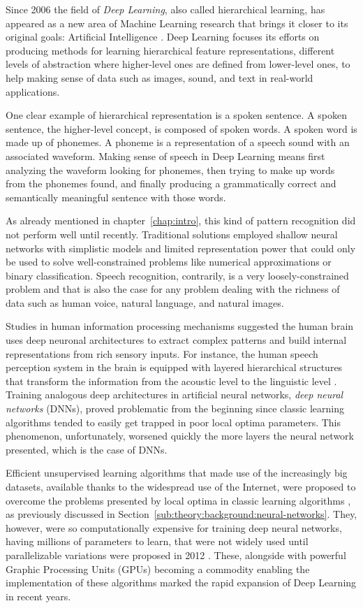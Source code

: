 Since 2006 the field of \emph{Deep Learning}, also called hierarchical learning, has appeared as a new area of Machine Learning research that brings it closer to its original goals: Artificial Intelligence \cite{Deng2014}.
Deep Learning focuses its efforts on producing methods for learning hierarchical feature representations, different levels of abstraction where higher-level ones are defined from lower-level ones, to help making sense of data such as images, sound, and text in real-world applications.

One clear example of hierarchical representation is a spoken sentence.
A spoken sentence, the higher-level concept, is composed of spoken words.
A spoken word is made up of phonemes.
A phoneme is a representation of a speech sound with an associated waveform.
Making sense of speech in Deep Learning means first analyzing the waveform looking for phonemes, then trying to make up words from the phonemes found, and finally producing a grammatically correct and semantically meaningful sentence with those words.

As already mentioned in chapter~\ref{chap:intro}, this kind of pattern recognition did not perform well until recently.
Traditional solutions employed shallow neural networks with simplistic models and limited representation power that could only be used to solve well-constrained problems like numerical approximations or binary classification.
Speech recognition, contrarily, is a very loosely-constrained problem and that is also the case for any problem dealing with the richness of data such as human voice, natural language, and natural images.

Studies in human information processing mechanisms suggested the human brain uses deep neuronal architectures to extract complex patterns and build internal representations from rich sensory inputs.
For instance, the human speech perception system in the brain is equipped with layered hierarchical structures that transform the information from the acoustic level to the linguistic level \cite{Deng1999,Baker2009}.
Training analogous deep architectures in artificial neural networks, \emph{deep neural networks} (DNNs), proved problematic from the beginning since classic learning algorithms tended to easily get trapped in poor local optima parameters.
This phenomenon, unfortunately, worsened quickly the more layers the neural network presented, which is the case of DNNs.

Efficient unsupervised learning algorithms that made use of the increasingly big datasets, available thanks to the widespread use of the Internet, were proposed to overcome the problems presented by local optima in classic learning algorithms \cite{LeCun2004,Hinton2006}, as previously discussed in Section~\ref{sub:theory:background:neural-networks}.
They, however, were so computationally expensive for training deep neural networks, having millions of parameters to learn, that were not widely used until parallelizable variations were proposed in 2012 \cite{Dean2012,Chen2012}.
These, alongside with powerful Graphic Processing Units (GPUs) becoming a commodity enabling the implementation of these algorithms marked the rapid expansion of Deep Learning in recent years.

